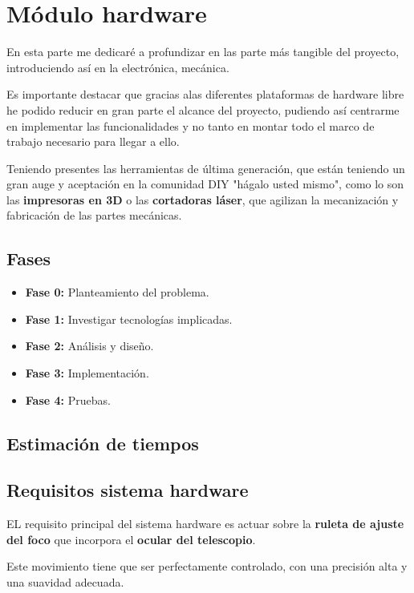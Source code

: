 \chapter{Módulo hardware}

\bigskip
En esta parte me dedicaré a profundizar en las parte más tangible del proyecto, introduciendo así en la electrónica, 
mecánica.

\bigskip
Es importante destacar que gracias alas  diferentes plataformas de hardware libre he podido reducir en gran parte el alcance del proyecto, pudiendo así centrarme en implementar las funcionalidades y no tanto en montar todo el marco de trabajo necesario para llegar a ello. 

\bigskip
Teniendo presentes las  herramientas de última generación, que están teniendo un gran auge y aceptación 
en la comunidad DIY \cite{DIY} "hágalo usted mismo", como lo son las \textbf{impresoras en 3D} o las \textbf{cortadoras láser}, que agilizan la mecanización y fabricación de las partes mecánicas.

\section{Fases}

\begin{itemize}
	\item \textbf{Fase 0:} Planteamiento del problema.
	\item \textbf{Fase 1:} Investigar tecnologías implicadas.
	\item \textbf{Fase 2:} Análisis y diseño.
	\item \textbf{Fase 3:} Implementación.
	\item \textbf{Fase 4:} Pruebas.
\end{itemize}


\section{Estimación de tiempos}



\section{Requisitos sistema hardware}

EL requisito principal del sistema hardware es actuar sobre la \textbf{ruleta de ajuste del foco} que incorpora el \textbf{ocular del telescopio}. 

Este movimiento tiene que ser perfectamente controlado, con una precisión alta y una suavidad adecuada. 

